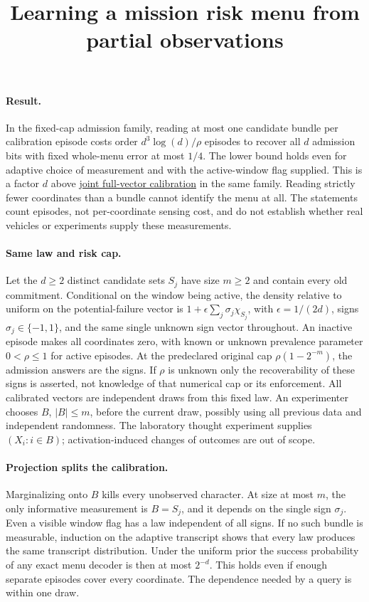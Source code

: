 \documentclass{article}
\title{Learning a mission risk menu from partial observations}
\begin{document}
\maketitle

\paragraph{Result.}
In the fixed-cap admission family, reading at most one candidate
bundle per calibration episode costs order
\(d^3\log(d)/\rho\) episodes to recover all \(d\) admission bits
with fixed whole-menu error at most \(1/4\). The lower bound holds
even for adaptive choice of measurement and with the active-window
flag supplied. This is a factor \(d\) above
\href{../Calibrating_An_Admission_Menu.tex}{joint full-vector calibration}
in the same family. Reading strictly fewer coordinates than a
bundle cannot identify the menu at all. The statements count
episodes, not per-coordinate sensing cost, and do not establish
whether real vehicles or experiments supply these measurements.

\paragraph{Same law and risk cap.}
Let the \(d\ge2\) distinct candidate sets \(S_j\) have size
\(m\ge2\) and contain every old commitment. Conditional on the
window being active, the density relative to uniform on the
potential-failure vector is
\(1+\epsilon\sum_j\sigma_j\chi_{S_j}\), with
\(\epsilon=1/(2d)\), signs \(\sigma_j\in\{-1,1\}\), and the same
single unknown sign vector throughout. An inactive episode makes
all coordinates zero, with known or unknown prevalence parameter
\(0<\rho\le1\) for active episodes. At the predeclared original
cap \(\rho(1-2^{-m})\), the admission answers are the signs.
If \(\rho\) is unknown only the recoverability of these signs is
asserted, not knowledge of that numerical cap or its enforcement.
All calibrated vectors are independent draws from this fixed law.
An experimenter chooses \(B\), \(|B|\le m\), before the current
draw, possibly using all previous data and independent randomness.
The laboratory thought experiment supplies \((X_i:i\in B)\);
activation-induced changes of outcomes are out of scope.

\paragraph{Projection splits the calibration.}
Marginalizing onto \(B\) kills every unobserved character.
At size at most \(m\), the only informative measurement is
\(B=S_j\), and it depends on the single sign \(\sigma_j\).
Even a visible window flag has a law independent of all signs.
If no such bundle is measurable, induction on the adaptive
transcript shows that every law produces the same transcript
distribution. Under the uniform prior the success probability
of any exact menu decoder is then at most \(2^{-d}\).
This holds even if enough separate episodes cover every
coordinate. The dependence needed by a query is within one draw.
\end{document}
